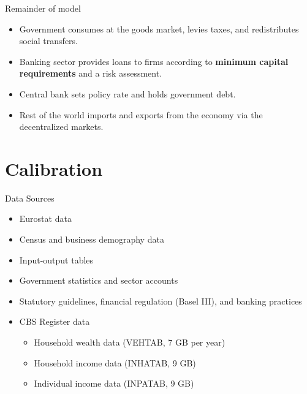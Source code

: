 \documentclass[9pt]{beamer}
\begin{document}
\begin{frame}{Remainder of model}
    \begin{itemize}
        \item Government consumes at the goods market, levies taxes, and redistributes social transfers.  \hyperlink{Government}{}
    \label{ReturnOverview}
        \item Banking sector provides loans to firms according to \textbf{minimum capital requirements} and a risk assessment.       \hyperlink{Bank}{}
        \item Central bank sets policy rate and holds government debt.     \hyperlink{CentralBank}{}
        \item Rest of the world imports and exports from the economy via the decentralized markets.         \hyperlink{Imports}{}
    \end{itemize}
\end{frame}





\section{Calibration}
\begin{frame}{Data Sources}
    \begin{itemize}
        \item Eurostat data
        \item Census and business demography data
        \item Input-output tables
        \item Government statistics and sector accounts
        \item Statutory guidelines, financial regulation (Basel III), and banking practices
        \item CBS Register data 
        \begin{itemize}
            \item Household wealth data (VEHTAB, 7 GB per year)
            \item Household income data (INHATAB, 9 GB)
            \item Individual income data (INPATAB, 9 GB)
    
        \end{itemize}
    \end{itemize}
\end{frame}
\end{document}
